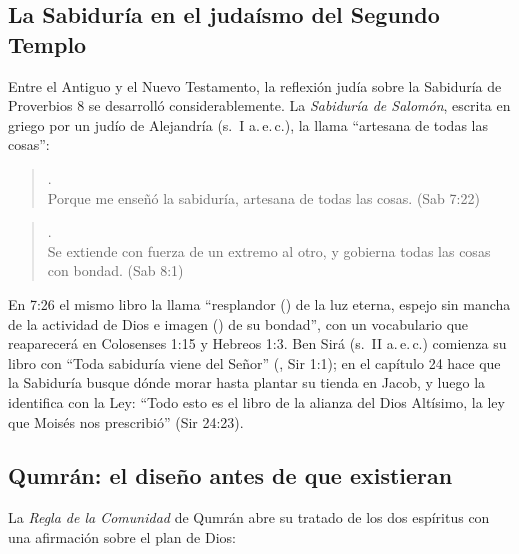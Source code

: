 \subsection{La Sabiduría en el judaísmo del Segundo Templo}

Entre el Antiguo y el Nuevo Testamento, la reflexión judía sobre la Sabiduría de Proverbios 8 se desarrolló considerablemente. La \emph{Sabiduría de Salomón}, escrita en griego por un judío de Alejandría (s.~I a.\,e.\,c.), la llama ``artesana de todas las cosas'':

\begin{quote}\small
{}.\\
Porque me enseñó la sabiduría, artesana de todas las cosas. (Sab 7:22)
\end{quote}

\begin{quote}\small
{}.\\
Se extiende con fuerza de un extremo al otro, y gobierna todas las cosas con bondad. (Sab 8:1)
\end{quote}

En 7:26 el mismo libro la llama ``resplandor () de la luz eterna, espejo sin mancha de la actividad de Dios e imagen () de su bondad'', con un vocabulario que reaparecerá en Colosenses 1:15 y Hebreos 1:3. Ben Sirá (s.~II a.\,e.\,c.) comienza su libro con ``Toda sabiduría viene del Señor'' (, Sir 1:1); en el capítulo 24 hace que la Sabiduría busque dónde morar hasta plantar su tienda en Jacob, y luego la identifica con la Ley: ``Todo esto es el libro de la alianza del Dios Altísimo, la ley que Moisés nos prescribió'' (Sir 24:23).


\subsection{Qumrán: el diseño antes de que existieran}

La \emph{Regla de la Comunidad} de Qumrán abre su tratado de los dos espíritus con una afirmación sobre el plan de Dios:



